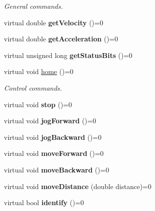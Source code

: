 \begin{DoxyCompactItemize}
\begin{DoxyCompactList}\small\item\em General commands. \end{DoxyCompactList}\item 
virtual double {\bfseries get\+Velocity} ()=0\hypertarget{class_a_p_t_motor_aabe9fbb03e1ccd51990969beb46ed242}{}\label{class_a_p_t_motor_aabe9fbb03e1ccd51990969beb46ed242}

\item 
virtual double {\bfseries get\+Acceleration} ()=0\hypertarget{class_a_p_t_motor_a74b061f1f03449e112d9b03138427020}{}\label{class_a_p_t_motor_a74b061f1f03449e112d9b03138427020}

\item 
virtual unsigned long {\bfseries get\+Status\+Bits} ()=0\hypertarget{class_a_p_t_motor_a154652d2161514547d9f928ca7ecae3e}{}\label{class_a_p_t_motor_a154652d2161514547d9f928ca7ecae3e}

\item 
virtual void \hyperlink{class_a_p_t_motor_a6b9fd63180ace89c56f4fcd56d4ddfa9}{home} ()=0\hypertarget{class_a_p_t_motor_a6b9fd63180ace89c56f4fcd56d4ddfa9}{}\label{class_a_p_t_motor_a6b9fd63180ace89c56f4fcd56d4ddfa9}

\begin{DoxyCompactList}\small\item\em Control commands. \end{DoxyCompactList}\item 
virtual void {\bfseries stop} ()=0\hypertarget{class_a_p_t_motor_a63cfe446c355e949b82d506fcf85cf70}{}\label{class_a_p_t_motor_a63cfe446c355e949b82d506fcf85cf70}

\item 
virtual void {\bfseries jog\+Forward} ()=0\hypertarget{class_a_p_t_motor_a0bb4d20c8dd6031699239b9f900fdb6f}{}\label{class_a_p_t_motor_a0bb4d20c8dd6031699239b9f900fdb6f}

\item 
virtual void {\bfseries jog\+Backward} ()=0\hypertarget{class_a_p_t_motor_ac6daef63ef5eb26b29b7b4df2a4a6dc0}{}\label{class_a_p_t_motor_ac6daef63ef5eb26b29b7b4df2a4a6dc0}

\item 
virtual void {\bfseries move\+Forward} ()=0\hypertarget{class_a_p_t_motor_adb39b12c71458a8865118123d27026ab}{}\label{class_a_p_t_motor_adb39b12c71458a8865118123d27026ab}

\item 
virtual void {\bfseries move\+Backward} ()=0\hypertarget{class_a_p_t_motor_a4fe7c7dc47f1d4378781b0f338caa914}{}\label{class_a_p_t_motor_a4fe7c7dc47f1d4378781b0f338caa914}

\item 
virtual void {\bfseries move\+Distance} (double distance)=0\hypertarget{class_a_p_t_motor_a109ecfbfb34bca32fa7a453f702ebd59}{}\label{class_a_p_t_motor_a109ecfbfb34bca32fa7a453f702ebd59}

\item 
virtual bool {\bfseries identify} ()=0\hypertarget{class_a_p_t_motor_a39036449d88ca4ea1774228aee4c4eb6}{}\label{class_a_p_t_motor_a39036449d88ca4ea1774228aee4c4eb6}

\end{DoxyCompactItemize}
